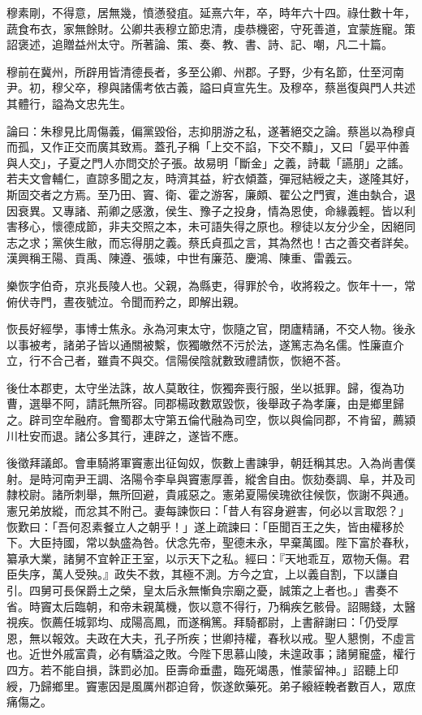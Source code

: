 \begin{pinyinscope}
穆素剛，不得意，居無幾，憤懣發疽。延熹六年，卒，時年六十四。祿仕數十年，蔬食布衣，家無餘財。公卿共表穆立節忠清，虔恭機密，守死善道，宜蒙旌寵。策詔褒述，追贈益州太守。所著論、策、奏、教、書、詩、記、嘲，凡二十篇。

穆前在冀州，所辟用皆清德長者，多至公卿、州郡。子野，少有名節，仕至河南尹。初，穆父卒，穆與諸儒考依古義，謚曰貞宣先生。及穆卒，蔡邕復與門人共述其體行，謚為文忠先生。

論曰：朱穆見比周傷義，偏黨毀俗，志抑朋游之私，遂著絕交之論。蔡邕以為穆貞而孤，又作正交而廣其致焉。蓋孔子稱「上交不諂，下交不黷」，又曰「晏平仲善與人交」，子夏之門人亦問交於子張。故易明「斷金」之義，詩載「讌朋」之謠。若夫文會輔仁，直諒多聞之友，時濟其益，紵衣傾蓋，彈冠結綬之夫，遂隆其好，斯固交者之方焉。至乃田、竇、衛、霍之游客，廉頗、翟公之門賓，進由埶合，退因衰異。又專諸、荊卿之感激，侯生、豫子之投身，情為恩使，命緣義輕。皆以利害移心，懷德成節，非夫交照之本，未可語失得之原也。穆徒以友分少全，因絕同志之求；黨俠生敝，而忘得朋之義。蔡氏貞孤之言，其為然也！古之善交者詳矣。漢興稱王陽、貢禹、陳遵、張竦，中世有廉范、慶鴻、陳重、雷義云。

樂恢字伯奇，京兆長陵人也。父親，為縣吏，得罪於令，收將殺之。恢年十一，常俯伏寺門，晝夜號泣。令聞而矜之，即解出親。

恢長好經學，事博士焦永。永為河東太守，恢隨之官，閉廬精誦，不交人物。後永以事被考，諸弟子皆以通關被繫，恢獨皦然不污於法，遂篤志為名儒。性廉直介立，行不合己者，雖貴不與交。信陽侯陰就數致禮請恢，恢絕不荅。

後仕本郡吏，太守坐法誅，故人莫敢往，恢獨奔喪行服，坐以抵罪。歸，復為功曹，選舉不阿，請託無所容。同郡楊政數眾毀恢，後舉政子為孝廉，由是鄉里歸之。辟司空牟融府。會蜀郡太守第五倫代融為司空，恢以與倫同郡，不肯留，薦潁川杜安而退。諸公多其行，連辟之，遂皆不應。

後徵拜議郎。會車騎將軍竇憲出征匈奴，恢數上書諫爭，朝廷稱其忠。入為尚書僕射。是時河南尹王調、洛陽令李阜與竇憲厚善，縱舍自由。恢劾奏調、阜，并及司隸校尉。諸所刺舉，無所回避，貴戚惡之。憲弟夏陽侯瑰欲往候恢，恢謝不與通。憲兄弟放縱，而忿其不附己。妻每諫恢曰：「昔人有容身避害，何必以言取怨？」恢歎曰：「吾何忍素餐立人之朝乎！」遂上疏諫曰：「臣聞百王之失，皆由權移於下。大臣持國，常以埶盛為咎。伏念先帝，聖德未永，早棄萬國。陛下富於春秋，纂承大業，諸舅不宜幹正王室，以示天下之私。經曰：『天地乖互，眾物夭傷。君臣失序，萬人受殃。』政失不救，其極不測。方今之宜，上以義自割，下以謙自引。四舅可長保爵土之榮，皇太后永無慚負宗廟之憂，誠策之上者也。」書奏不省。時竇太后臨朝，和帝未親萬機，恢以意不得行，乃稱疾乞骸骨。詔賜錢，太醫視疾。恢薦任城郭均、成陽高鳳，而遂稱篤。拜騎都尉，上書辭謝曰：「仍受厚恩，無以報效。夫政在大夫，孔子所疾；世卿持權，春秋以戒。聖人懇惻，不虛言也。近世外戚富貴，必有驕溢之敗。今陛下思慕山陵，未遑政事；諸舅寵盛，權行四方。若不能自損，誅罰必加。臣壽命垂盡，臨死竭愚，惟蒙留神。」詔聽上印綬，乃歸鄉里。竇憲因是風厲州郡迫脅，恢遂飲藥死。弟子縗絰輓者數百人，眾庶痛傷之。


\end{pinyinscope}
